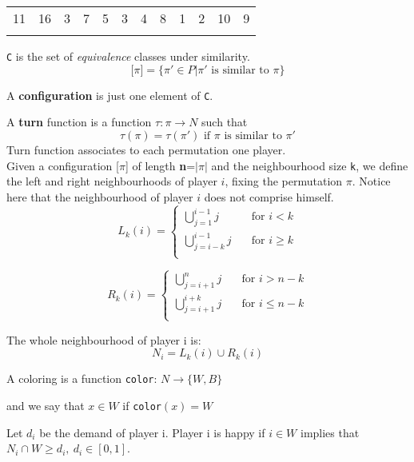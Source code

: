 \documentclass[../main.tex]{subfiles}
\begin{document}
\begin{table}[H]
\begin{center}
{\begin{tabular}{| c |c| c| c| c |c| c |c| c |c |c |c |}
\hline
11 & 16 &3 &7 &5 &3  &4 &8 &1 &2 &10 & 9 \\
\x & \x &\z &\z &\z &\z  &\z &\z &\x &\x &\x & \x \\
 \hline
\end{tabular}}
\end{center}
\end{table}

\verb|C| is the set of \textit{equivalence} classes under similarity.
\[ \big[ \pi \big] = \{ \pi'\in P | \pi'\mbox{ is similar to }\pi \} \]

A \textbf{configuration} is just one element of \verb|C|.

A \textbf{turn} function is a function $ \tau : \pi \rightarrow N $ such that 
\[ \tau (\pi) = \tau(\pi')\mbox{ if } \pi\mbox{ is similar to }\pi'\]
Turn function associates to each permutation one player.\\

Given a configuration [$\pi$] of length {\bf n}=$|\pi|$ and the neighbourhood size \verb|k|, we define the left and right neighbourhoods of player $i$, fixing the permutation $\pi$. Notice here that the neighbourhood of player $i$ does not comprise himself.
\[ L_k(i) = 
  \begin{cases}
    \bigcup\limits_{j=1}^{i-1} j  & \quad \text{for } i< k\\
    \bigcup\limits_{j=i-k}^{i-1} j & \quad \text{for } i \geq k\\
  \end{cases}
\]

\[ R_k(i) = 
  \begin{cases}
    \bigcup\limits_{j=i+1}^{n} j      & \quad \text{for } i> n-k\\
    \bigcup\limits_{j=i+1}^{i+k} j      & \quad \text{for } i \leq n-k\\
  \end{cases}
\]

The whole neighbourhood of player i is:
\[ N_i = L_k(i) \cup R_k(i) \]

A coloring is a function \verb|color|: $ N \to \{W,B\}$

 and we say that $x \in W$ if \verb|color|$(x)=W$
 
Let $d_i$ be the demand of player i.
 Player i is happy if $i\in W$ implies that $N_i \cap W \geq d_i,\ d_i \in [0,1]$.
 
\end{document}
